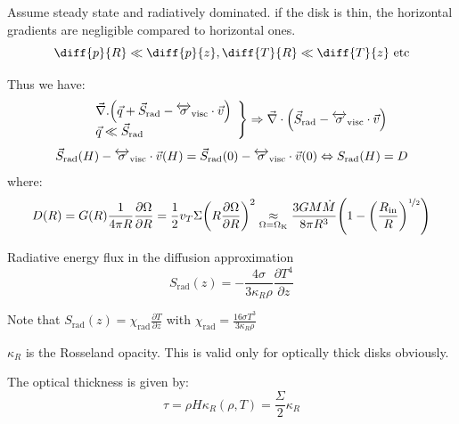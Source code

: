 \documentclass[10pt,a4paper,english]{article}
\let\originalleft\left
\let\originalright\right
\renewcommand{\left}{\mathopen{}\mathclose\bgroup\originalleft}
\renewcommand{\right}{\aftergroup\egroup\originalright}
\begin{document}
Assume steady state and radiatively dominated. if the disk is thin, the
horizontal gradients are negligible compared to horizontal ones.
\begin{equation}
    \diff{p}{R} \ll \diff{p}{z}, \diff{T}{R} \ll \diff{T}{z}\text{  etc}
\end{equation}

Thus we have:
\begin{equation}
    \left.
    \begin{array}{ll}
        & \vec{\nabla}.\left( \vec{q}+\vec{S}_\mathrm{rad}-\tens{\sigma}_\mathrm{visc}\cdot\vec{v}\right)\\
        & \vec{q} \ll \vec{S}_\mathrm{rad}
    \end{array}
\right \}\Rightarrow \vec{\nabla}\cdot\left(\vec{S}_\mathrm{rad}-\tens{\sigma}_\mathrm{visc}\cdot\vec{v}\right)
\end{equation}
\begin{equation}
    \vec{S}_\mathrm{rad}(H) - \overleftrightarrow{\sigma}_\mathrm{visc}\cdot\vec{v}(H) = \vec{S}_\mathrm{rad}(0) - \overleftrightarrow{\sigma}_\mathrm{visc}\cdot\vec{v}(0) \Leftrightarrow
    S_\mathrm{rad}(H) = D
\end{equation}
where:
\begin{equation}
    D(R) = G(R)\frac{1}{4\pi R}\frac{\partial \Omega}{\partial R } =
    \frac{1}{2}v_T \Sigma\left(   R\frac{\partial \Omega}{\partial R }\right)^2 \underset{\mathrm{\Omega = \Omega_K}}{\approx}
    \frac{3GM\dot{M}}{8\pi R^3}\left( 1-\left(\frac{R_\mathrm{in}}{R}\right)^{\nicefrac{1}{2}}\right)
\end{equation}

Radiative energy flux in the diffusion approximation
\begin{equation}
    S_\mathrm{rad}(z) = -\frac{4\sigma}{3\kappa_R \rho}\frac{\partial T^4}{\partial	z}
\end{equation}

Note that $\displaystyle S_\mathrm{rad}(z) = \chi_\mathrm{rad} \frac{\partial T
}{\partial z } $ with $\displaystyle\chi_\mathrm{rad} = \frac{16 \sigma
T^3}{3\kappa_R \rho}$

$\kappa_R$ is the Rosseland opacity. This is valid only for optically thick
disks obviously.

The optical thickness is given by:
\begin{equation}
    \tau = \rho H \kappa_R(\rho ,T) = \frac{\Sigma}{2} \kappa_R
\end{equation}
\end{document}
